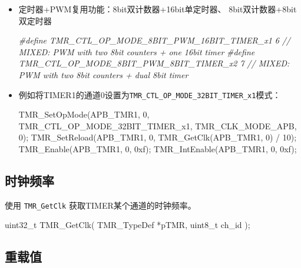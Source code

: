 \documentclass[
  12pt,
]{book}
\newenvironment{Shaded}{\begin{snugshade}}{\end{snugshade}}
\newcommand{\BaseNTok}[1]{\textcolor[rgb]{0.00,0.00,0.81}{#1}}
\newcommand{\CommentTok}[1]{\textcolor[rgb]{0.56,0.35,0.01}{\textit{#1}}}
\newcommand{\DataTypeTok}[1]{\textcolor[rgb]{0.13,0.29,0.53}{#1}}
\newcommand{\DecValTok}[1]{\textcolor[rgb]{0.00,0.00,0.81}{#1}}
\newcommand{\NormalTok}[1]{#1}
\newcommand{\PreprocessorTok}[1]{\textcolor[rgb]{0.56,0.35,0.01}{\textit{#1}}}
\begin{document}
\begin{itemize}
\item
  定时器+PWM复用功能：8bit双计数器+16bit单定时器、 8bit双计数器+8bit双定时器

\begin{Shaded}
\begin{Highlighting}[]
  \PreprocessorTok{#define TMR_CTL_OP_MODE_8BIT_PWM_16BIT_TIMER_x1   6           }\CommentTok{// MIXED: PWM with two 8bit counters + one 16bit timer}
  \PreprocessorTok{#define TMR_CTL_OP_MODE_8BIT_PWM_8BIT_TIMER_x2    7           }\CommentTok{// MIXED: PWM with two 8bit counters + dual 8bit timer}
\end{Highlighting}
\end{Shaded}
\item
  例如将TIMER1的通道0设置为\texttt{TMR\_CTL\_OP\_MODE\_32BIT\_TIMER\_x1}模式：

\begin{Shaded}
\begin{Highlighting}[]
\NormalTok{  TMR_SetOpMode(APB_TMR1, }\DecValTok{0}\NormalTok{, TMR_CTL_OP_MODE_32BIT_TIMER_x1, TMR_CLK_MODE_APB, }\DecValTok{0}\NormalTok{);}
\NormalTok{  TMR_SetReload(APB_TMR1, }\DecValTok{0}\NormalTok{, TMR_GetClk(APB_TMR1, }\DecValTok{0}\NormalTok{) / }\DecValTok{10}\NormalTok{);}
\NormalTok{  TMR_Enable(APB_TMR1, }\DecValTok{0}\NormalTok{, }\BaseNTok{0xf}\NormalTok{);}
\NormalTok{  TMR_IntEnable(APB_TMR1, }\DecValTok{0}\NormalTok{, }\BaseNTok{0xf}\NormalTok{);}
\end{Highlighting}
\end{Shaded}
\end{itemize}

\hypertarget{ux65f6ux949fux9891ux7387}{%
\subsection{时钟频率}\label{ux65f6ux949fux9891ux7387}}

使用 \texttt{TMR\_GetClk} 获取TIMER某个通道的时钟频率。

\begin{Shaded}
\begin{Highlighting}[]
\DataTypeTok{uint32_t}\NormalTok{ TMR_GetClk(}
\NormalTok{  TMR_TypeDef *pTMR, }
  \DataTypeTok{uint8_t}\NormalTok{ ch_id}
\NormalTok{  );}
\end{Highlighting}
\end{Shaded}

\hypertarget{ux91cdux8f7dux503c}{%
\subsection{重载值}\label{ux91cdux8f7dux503c}}
\end{document}
